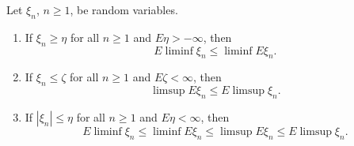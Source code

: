 Let $\xi_n$, $n \geq 1$, be random variables.
\begin{enumerate}
\item[(a)] If $\xi_n \geq \eta$ for all $n \geq 1$ and $E\eta > -\infty$, then
  $$E \liminf \xi_n \leq \liminf E \xi_n.$$
\item[(b)] If $\xi_n \leq \zeta$ for all $n \geq 1$ and $E\zeta < \infty$, then
  $$\limsup E \xi_n \leq E \limsup \xi_n.$$
\item[(c)] If $|\xi_n| \leq \eta$ for all $n \geq 1$ and $E\eta < \infty$, then
  $$E \liminf \xi_n \leq \liminf E \xi_n \leq \limsup E \xi_n \leq E \limsup \xi_n.$$
\end{enumerate}
